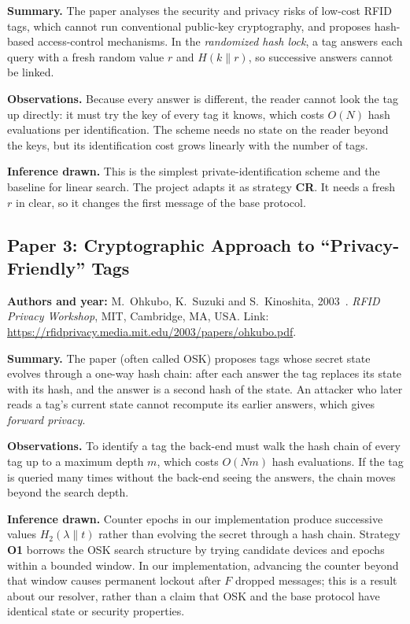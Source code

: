 \textbf{Summary.} The paper analyses the security and privacy risks of low-cost RFID tags, which cannot run conventional public-key cryptography, and proposes hash-based access-control mechanisms. In the \emph{randomized hash lock}, a tag answers each query with a fresh random value $r$ and $H(k\|r)$, so successive answers cannot be linked.

\textbf{Observations.} Because every answer is different, the reader cannot look the tag up directly: it must try the key of every tag it knows, which costs $O(N)$ hash evaluations per identification. The scheme needs no state on the reader beyond the keys, but its identification cost grows linearly with the number of tags.

\textbf{Inference drawn.} This is the simplest private-identification scheme and the baseline for linear search. The project adapts it as strategy \textbf{CR}. It needs a fresh $r$ in clear, so it changes the first message of the base protocol.

\subsection*{Paper 3: Cryptographic Approach to ``Privacy-Friendly'' Tags}
\textbf{Authors and year:} M.~Ohkubo, K.~Suzuki and S.~Kinoshita, 2003~\cite{ohkubo}. \emph{RFID Privacy Workshop}, MIT, Cambridge, MA, USA. Link: \url{https://rfidprivacy.media.mit.edu/2003/papers/ohkubo.pdf}.

\textbf{Summary.} The paper (often called OSK) proposes tags whose secret state evolves through a one-way hash chain: after each answer the tag replaces its state with its hash, and the answer is a second hash of the state. An attacker who later reads a tag's current state cannot recompute its earlier answers, which gives \emph{forward privacy}.

\textbf{Observations.} To identify a tag the back-end must walk the hash chain of every tag up to a maximum depth $m$, which costs $O(Nm)$ hash evaluations. If the tag is queried many times without the back-end seeing the answers, the chain moves beyond the search depth.

\textbf{Inference drawn.} Counter epochs in our implementation produce successive values $H_2(\lambda\|t)$ rather than evolving the secret through a hash chain. Strategy \textbf{O1} borrows the OSK search structure by trying candidate devices and epochs within a bounded window. In our implementation, advancing the counter beyond that window causes permanent lockout after $F$ dropped messages; this is a result about our resolver, rather than a claim that OSK and the base protocol have identical state or security properties.

